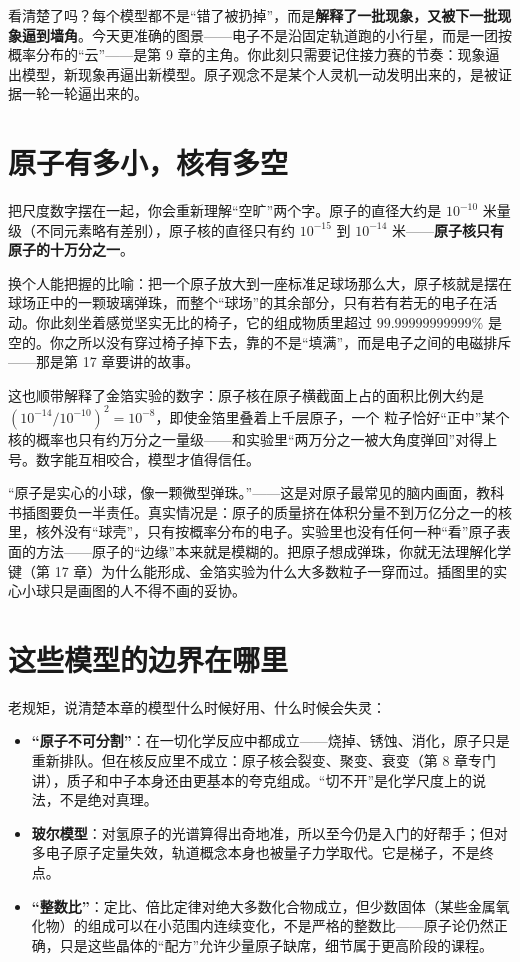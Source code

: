 看清楚了吗？每个模型都不是“错了被扔掉”，而是\textbf{解释了一批现象，又被下一批现象逼到墙角}。今天更准确的图景——电子不是沿固定轨道跑的小行星，而是一团按概率分布的“云”——是第 9 章的主角。你此刻只需要记住接力赛的节奏：现象逼出模型，新现象再逼出新模型。原子观念不是某个人灵机一动发明出来的，是被证据一轮一轮逼出来的。

\section{原子有多小，核有多空}

把尺度数字摆在一起，你会重新理解“空旷”两个字。原子的直径大约是 $10^{-10}$ 米量级（不同元素略有差别），原子核的直径只有约 $10^{-15}$ 到 $10^{-14}$ 米——\textbf{原子核只有原子的十万分之一}。

换个人能把握的比喻：把一个原子放大到一座标准足球场那么大，原子核就是摆在球场正中的一颗玻璃弹珠，而整个“球场”的其余部分，只有若有若无的电子在活动。你此刻坐着感觉坚实无比的椅子，它的组成物质里超过 $99.99999999999\%$ 是空的。你之所以没有穿过椅子掉下去，靠的不是“填满”，而是电子之间的电磁排斥——那是第 17 章要讲的故事。

这也顺带解释了金箔实验的数字：原子核在原子横截面上占的面积比例大约是 $(10^{-14}/10^{-10})^2 = 10^{-8}$，即使金箔里叠着上千层原子，一个 \chem{\alpha} 粒子恰好“正中”某个核的概率也只有约万分之一量级——和实验里“两万分之一被大角度弹回”对得上号。数字能互相咬合，模型才值得信任。

\begin{wuqu}
“原子是实心的小球，像一颗微型弹珠。”——这是对原子最常见的脑内画面，教科书插图要负一半责任。真实情况是：原子的质量挤在体积分量不到万亿分之一的核里，核外没有“球壳”，只有按概率分布的电子。实验里也没有任何一种“看”原子表面的方法——原子的“边缘”本来就是模糊的。把原子想成弹珠，你就无法理解化学键（第 17 章）为什么能形成、金箔实验为什么大多数粒子一穿而过。插图里的实心小球只是画图的人不得不画的妥协。
\end{wuqu}

\section{这些模型的边界在哪里}

老规矩，说清楚本章的模型什么时候好用、什么时候会失灵：

\begin{itemize}[itemsep=2pt]
\item \textbf{“原子不可分割”}：在一切化学反应中都成立——烧掉、锈蚀、消化，原子只是重新排队。但在核反应里不成立：原子核会裂变、聚变、衰变（第 8 章专门讲），质子和中子本身还由更基本的夸克组成。“切不开”是化学尺度上的说法，不是绝对真理。
\item \textbf{玻尔模型}：对氢原子的光谱算得出奇地准，所以至今仍是入门的好帮手；但对多电子原子定量失效，轨道概念本身也被量子力学取代。它是梯子，不是终点。
\item \textbf{“整数比”}：定比、倍比定律对绝大多数化合物成立，但少数固体（某些金属氧化物）的组成可以在小范围内连续变化，不是严格的整数比——原子论仍然正确，只是这些晶体的“配方”允许少量原子缺席，细节属于更高阶段的课程。
\end{itemize}

